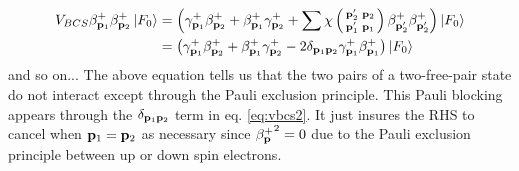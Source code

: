 \documentclass[aps,pra,amsmath,amssymb,preprint,groupedaddress]{revtex4}
\begin{document}
\begin{equation}\label{eq:vbcs2}
\begin{split}
V_{BCS}\beta^+_{\mathbf{p}_1}\beta^+_{\mathbf{p}_2}\left|F_0\right>&=\left(\gamma^+_{\mathbf{p}_1}\beta^+_{\mathbf{p}_2}+\beta^+_{\mathbf{p}_1}\gamma^+_{\mathbf{p}_2}+\sum\chi\left(\begin{smallmatrix}\mathbf{p}'_2&\mathbf{p}_2\\\mathbf{p}'_1&\mathbf{p}_1\end{smallmatrix}\right)\beta^+_{\mathbf{p}'_2}\beta^+_{\mathbf{p}'_2}\right)\left|F_0\right>\\
&=\left(\gamma^+_{\mathbf{p}_1}\beta^+_{\mathbf{p}_2}+\beta^+_{\mathbf{p}_1}\gamma^+_{\mathbf{p}_2}-2\delta_{\mathbf{p}_1\mathbf{p}_2}\gamma^+_{\mathbf{p}_1}\beta^+_{\mathbf{p}_1}\right)\left|F_0\right>
\end{split}
\end{equation}
and so on... The above equation tells us that the two pairs of a two-free-pair state do not interact except through the Pauli exclusion principle.  This Pauli blocking appears through the $\delta_{\mathbf{p}_1\mathbf{p}_2}$ term in eq. \eqref{eq:vbcs2}. It just insures the RHS to cancel when  $\mathbf{p}_1=\mathbf{p}_2$ as necessary since ${\beta^+_{\mathbf{p}}}^2=0$ due to the Pauli exclusion principle between up or down spin electrons.%
\end{document}
